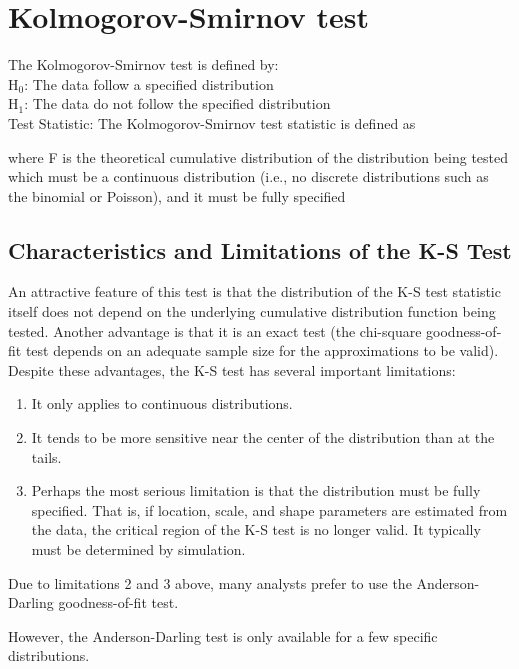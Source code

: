 \documentclass[a4paper,12pt]{article}
\begin{document}
\newpage

\section{Kolmogorov-Smirnov test}
 The Kolmogorov-Smirnov test is defined by:
\\
H$_0$:     The data follow a specified distribution\\
H$_1$:     The data do not follow the specified distribution\\

Test Statistic:     The Kolmogorov-Smirnov test statistic is defined as

where F is the theoretical cumulative distribution of the distribution being tested which must be a continuous distribution (i.e., no discrete distributions such as the binomial or Poisson), and it must be fully specified

\subsection{ Characteristics and Limitations of the K-S Test}


An attractive feature of this test is that the distribution of the K-S test statistic itself does not depend on the underlying cumulative distribution function being tested. Another advantage is that it is an exact test (the chi-square goodness-of-fit test depends on an adequate sample size for the approximations to be valid). Despite these advantages, the K-S test has several important limitations:
\begin{enumerate}
\item It only applies to continuous distributions.
\item It tends to be more sensitive near the center of the distribution than at the tails.
\item Perhaps the most serious limitation is that the distribution must be fully specified. That is, if location, scale, and shape parameters are estimated from the data, the critical region of the K-S test is no longer valid. It typically must be determined by simulation.
\end{enumerate}
Due to limitations 2 and 3 above, many analysts prefer to use the Anderson-Darling goodness-of-fit test.

However, the Anderson-Darling test is only available for a few specific distributions.
\end{document}
